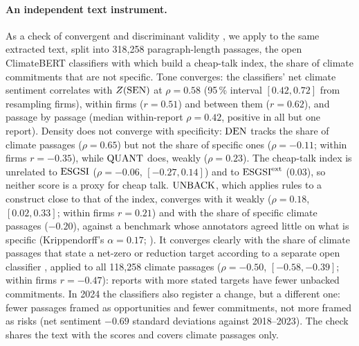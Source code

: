 \paragraph{An independent text instrument.} As a check of convergent and
discriminant validity \citep{campbell1959}, we apply to the same extracted text,
split into 318{,}258 paragraph-length passages, the open ClimateBERT classifiers
\citep{webersinke2021} with which \citet{bingler2024} build a cheap-talk
index, the share of climate commitments that are not specific. Tone
converges: the classifiers' net climate sentiment correlates with $Z(\mathrm{SEN})$ at
$\rho = 0.58$ (95\,\% interval $[0.42, 0.72]$ from resampling firms), within
firms ($r = 0.51$) and between them ($r = 0.62$), and passage by passage (median
within-report $\rho = 0.42$, positive in all but one report). Density does not
converge with specificity: $\mathrm{DEN}$ tracks the share of climate passages
($\rho = 0.65$) but not the share of specific ones ($\rho = -0.11$; within firms
$r = -0.35$), while $\mathrm{QUANT}$ does, weakly ($\rho = 0.23$). The cheap-talk index
is unrelated to $\mathrm{ESGSI}$ ($\rho = -0.06$, $[-0.27, 0.14]$) and to $\mathrm{ESGSI}^{\mathrm{ext}}$
($0.03$), so neither score is a proxy for cheap talk. $\mathrm{UNBACK}$, which applies
rules to a construct close to that of the index, converges with it weakly
($\rho = 0.18$, $[0.02, 0.33]$; within firms $r = 0.21$) and with the share of
specific climate passages ($-0.20$), against a benchmark whose annotators
agreed little on what is specific (Krippendorff's $\alpha = 0.17$;
\citealp{bingler2024}). It converges clearly with the share of climate
passages that state a net-zero or reduction target according to a separate
open classifier \citep{schimanski2023netzero}, applied to all 118{,}258
climate passages ($\rho = -0.50$, $[-0.58, -0.39]$; within firms
$r = -0.47$): reports with more stated targets have fewer unbacked
commitments. In 2024 the classifiers also register a change, but a different
one: fewer passages framed as opportunities and fewer commitments, not more
framed as risks (net sentiment $-0.69$ standard deviations against 2018--2023).
The check shares the text with the scores and covers climate passages only.

